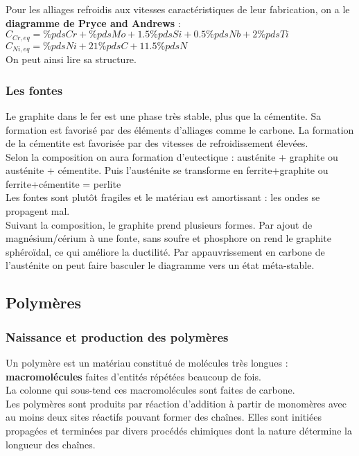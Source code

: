 \documentclass[../main.tex]{subfiles}
\begin{document}
Pour les alliages refroidis aux vitesses caractéristiques de leur fabrication, on a le \textbf{diagramme de Pryce and Andrews} : \\
$C_{Cr, eq} = \% pds Cr + \% pds Mo + 1.5\% pds Si + 0.5\% pds Nb + 2\% pds Ti$\\
$C_{Ni, eq} = \%pds Ni + 21\% pds C + 11.5\% pds N$\\
On peut ainsi lire sa structure.\\

\subsubsection{Les fontes}
Le graphite dans le fer est une phase très stable, plus que la cémentite. Sa formation est favorisé par des éléments d'alliages comme le carbone. La formation de la cémentite est favorisée par des vitesses de refroidissement élevées.\\

Selon la composition on aura formation d'eutectique : austénite + graphite ou austénite + cémentite. Puis l'austénite se transforme en ferrite+graphite ou ferrite+cémentite = perlite\\
\warning Les fontes sont plutôt fragiles et le matériau est amortissant : les ondes se propagent mal.\\

Suivant la composition, le graphite prend plusieurs formes. Par ajout de magnésium/cérium à une fonte, sans soufre et phosphore on rend le graphite sphéroïdal, ce qui améliore la ductilité. Par appauvrissement en carbone de l'austénite on peut faire basculer le diagramme vers un état méta-stable.\\

\subsection{Polymères}

\subsubsection{Naissance et production des polymères}
Un polymère est un matériau constitué de molécules très longues : \textbf{macromolécules} faites d'entités répétées beaucoup de fois.\\
La colonne qui sous-tend ces macromolécules sont faites de carbone.\\

Les polymères sont produits par réaction d'addition à partir de monomères avec au moins deux sites réactifs pouvant former des chaînes. Elles sont initiées propagées et terminées par divers procédés chimiques dont la nature détermine la longueur des chaînes.\\
\end{document}
